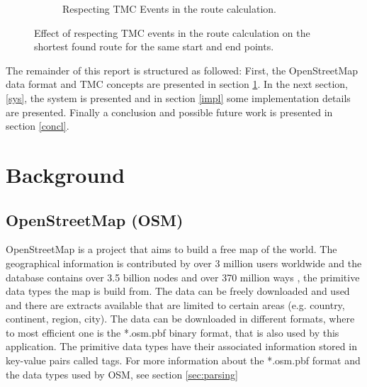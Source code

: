 \documentclass[a4paper]{scrartcl}
\begin{document}
\begin{figure}
\begin{subfigure}[b]{0.4\textwidth}
        \caption{Respecting TMC Events in the route calculation.}
        \label{fig:with_tmc}
    \end{subfigure}
    \caption{Effect of respecting TMC events in the route calculation on the shortest found route for the same start and end points.}\label{fig:tmc_comp}
\end{figure}

The remainder of this report is structured as followed: First, the OpenStreetMap data format and TMC concepts are presented in section \ref{bg}. In the next section, \ref{sys}, the system is presented and in section \ref{impl} some implementation details are presented. Finally a conclusion and possible future work is presented in section \ref{concl}.

\section{Background}
\label{bg}
\subsection{OpenStreetMap (OSM)}
OpenStreetMap \cite{osm_main} is a project that aims to build a free map of the world. The geographical information is contributed by over 3 million users worldwide and the database contains over 3.5 billion nodes and over 370 million ways \cite{osm_stats}, the primitive data types the map is build from. The data can be freely downloaded and used and there are extracts available that are limited to certain areas (e.g. country, continent, region, city). The data can be downloaded in different formats, where to most efficient one is the *.osm.pbf binary format, that is also used by this application. The primitive data types have their associated information stored in key-value pairs called tags. For more information about the *.osm.pbf format and the data types used by OSM, see section \ref{sec:parsing}
\end{document}
